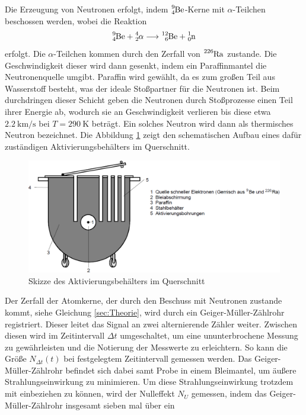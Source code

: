 Die Erzeugung von Neutronen erfolgt, indem $\ce{^{9}_{4}Be}$-Kerne mit $\alpha$-Teilchen beschossen werden, 
wobei die Reaktion 
\begin{equation}
    \ce{^{9}_{4}Be} + \ce{^{4}_{2}\alpha} \longrightarrow \ce{^{12}_{6}Be} + \ce{^{1}_{0}n}
\end{equation}
erfolgt. Die $\alpha$-Teilchen kommen durch den Zerfall von $\ce{^{226}Ra} $ zustande. Die Geschwindigkeit dieser wird dann gesenkt, indem ein Paraffinmantel die Neutronenquelle umgibt. Paraffin wird 
gewählt, da es zum großen Teil aus Wasserstoff besteht, was der ideale Stoßpartner für die Neutronen ist. Beim durchdringen 
dieser Schicht geben die Neutronen durch Stoßprozesse einen Teil ihrer Energie ab, wodurch sie an Geschwindigkeit verlieren bis 
diese etwa $\SI{2.2}{\kilo\metre\per\s} $ bei $T=\SI{290}{\kelvin} $ beträgt. Ein solches Neutron wird dann als thermisches 
Neutron bezeichnet. Die Abbildung \ref{fig:aktivierung} zeigt den schematischen Aufbau eines dafür zuständigen Aktivierungsbehälters
im Querschnitt. 
\begin{figure}
    \centering
    \includegraphics[width=\textwidth]{data/aktivierung.png}
    \caption{Skizze des Aktivierungsbehälters im Querschnitt \cite{V702}}
    \label{fig:aktivierung}
\end{figure}
\FloatBarrier
Der Zerfall der Atomkerne, der durch den Beschuss mit Neutronen zustande kommt, siehe Gleichung \ref{sec:Theorie}, wird durch ein 
Geiger-Müller-Zählrohr registriert. Dieser leitet das Signal an zwei alternierende Zähler weiter. Zwischen diesen wird im Zeitintervall
$\Delta t$ umgeschaltet, um eine ununterbrochene Messung zu gewährleisten und die Notierung der Messwerte zu erleichtern.
So kann die Größe $N_{\Delta t}(t) $ bei festgelegtem Zeitintervall gemessen werden. Das Geiger-Müller-Zählrohr befindet sich dabei 
samt Probe in einem Bleimantel, um äußere Strahlungseinwirkung zu minimieren. Um diese Strahlungseinwirkung trotzdem mit 
einbeziehen zu können, wird der Nulleffekt $N_U$ gemessen, indem das Geiger-Müller-Zählrohr insgesamt sieben mal über ein 
